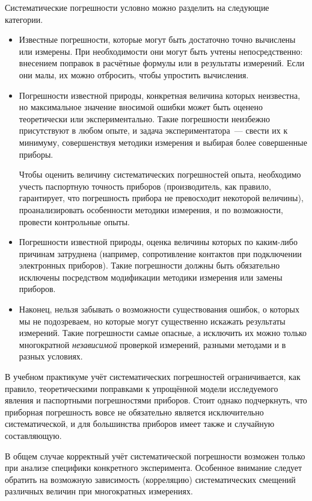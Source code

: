 Систематические погрешности условно можно разделить на следующие категории.
\begin{itemize}\small
    \item Известные погрешности, которые могут быть достаточно точно вычислены
или измерены. При необходимости они могут быть учтены непосредственно:
внесением поправок в расчётные формулы или в результаты измерений.
Если они малы, их можно отбросить, чтобы упростить вычисления.

    \item Погрешности известной природы, конкретная величина которых неизвестна,
но максимальное значение вносимой ошибки может быть оценено теоретически
или экспериментально. Такие погрешности неизбежно присутствуют в любом
опыте, и задача экспериментатора~--- свести их к минимуму,
совершенствуя методики измерения и выбирая более совершенные приборы.

    Чтобы оценить величину систематических погрешностей опыта, необходимо
учесть паспортную точность приборов (производитель, как правило, гарантирует,
что погрешность прибора не превосходит некоторой величины), проанализировать
особенности методики измерения, и по возможности, провести контрольные
опыты.

    \item Погрешности известной природы, оценка величины которых по каким-либо
причинам затруднена (например, сопротивление контактов при подключении
электронных приборов). Такие погрешности должны быть обязательно исключены
посредством модификации методики измерения или замены приборов.

    \item Наконец, нельзя забывать о возможности существования ошибок, о
которых мы не подозреваем, но которые могут существенно искажать результаты
измерений. Такие погрешности самые опасные, а исключить их можно только
многократной \emph{независимой} проверкой измерений, разными методами
и в разных условиях.
\end{itemize}

В учебном практикуме учёт систематических погрешностей ограничивается,
как правило, теоретическими поправками
к упрощённой модели исследуемого явления и паспортными погрешностями приборов.
Стоит однако подчеркнуть, что приборная погрешность вовсе не обязательно является 
исключительно систематической, и для большинства приборов имеет также 
и случайную составляющую.

В общем случае корректный учёт систематической погрешности возможен только 
при анализе специфики конкретного эксперимента. Особенное внимание следует 
обратить на возможную зависимость (корреляцию) систематических смещений различных величин 
при многократных измерениях. 

